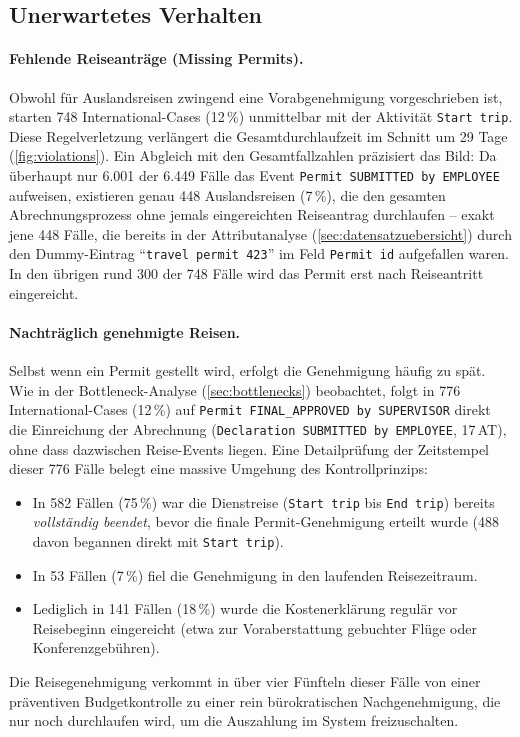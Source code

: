 \subsection{Unerwartetes Verhalten}
\label{sec:unerwartet}

\paragraph{Fehlende Reiseanträge (Missing Permits).}
Obwohl für Auslandsreisen zwingend eine Vorabgenehmigung vorgeschrieben ist, starten 748 International-Cases (12\,\%) unmittelbar mit der Aktivität \texttt{Start trip}. Diese Regelverletzung verlängert die Gesamtdurchlaufzeit im Schnitt um 29 Tage (\autoref{fig:violations}). Ein Abgleich mit den Gesamtfallzahlen präzisiert das Bild: Da überhaupt nur 6.001 der 6.449 Fälle das Event \texttt{Permit SUBMITTED by EMPLOYEE} aufweisen, existieren genau 448 Auslandsreisen (7\,\%), die den gesamten Abrechnungsprozess ohne jemals eingereichten Reiseantrag durchlaufen – exakt jene 448 Fälle, die bereits in der Attributanalyse (\autoref{sec:datensatzuebersicht}) durch den Dummy-Eintrag \enquote{\texttt{travel permit 423}} im Feld \texttt{Permit id} aufgefallen waren. In den übrigen rund 300 der 748 Fälle wird das Permit erst nach Reiseantritt eingereicht.

\paragraph{Nachträglich genehmigte Reisen.}
Selbst wenn ein Permit gestellt wird, erfolgt die Genehmigung häufig zu spät. Wie in der Bottleneck-Analyse (\autoref{sec:bottlenecks}) beobachtet, folgt in 776 International-Cases (12\,\%) auf \texttt{Permit FINAL\_APPROVED by SUPERVISOR} direkt die Einreichung der Abrechnung (\texttt{Declaration SUBMITTED by EMPLOYEE}, 17\,AT), ohne dass dazwischen Reise-Events liegen. Eine Detailprüfung der Zeitstempel dieser 776 Fälle belegt eine massive Umgehung des Kontrollprinzips:
\begin{itemize}[noitemsep]
	\item In 582 Fällen (75\,\%) war die Dienstreise (\texttt{Start trip} bis \texttt{End trip}) bereits \emph{vollständig beendet}, bevor die finale Permit-Genehmigung erteilt wurde (488 davon begannen direkt mit \texttt{Start trip}).
	\item In 53 Fällen (7\,\%) fiel die Genehmigung in den laufenden Reisezeitraum.
	\item Lediglich in 141 Fällen (18\,\%) wurde die Kostenerklärung regulär vor Reisebeginn eingereicht (etwa zur Voraberstattung gebuchter Flüge oder Konferenzgebühren).
\end{itemize}
Die Reisegenehmigung verkommt in über vier Fünfteln dieser Fälle von einer präventiven Budgetkontrolle zu einer rein bürokratischen Nachgenehmigung, die nur noch durchlaufen wird, um die Auszahlung im System freizuschalten.

